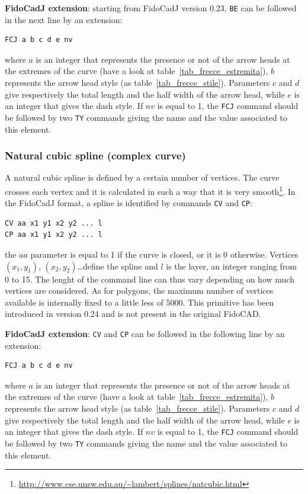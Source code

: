\documentclass[10pt,a4paper,twoside]{scrreprt}
\begin{document}
\textbf{FidoCadJ extension}: starting from FidoCadJ version 0.23, \lstinline!BE! can be followed in the next line by an extension:
\begin{lstlisting}
FCJ a b c d e nv
\end{lstlisting}
where $a$ is an integer that represents the presence or not of the arrow heads at the extremes of the curve (have a look at table~\ref{tab_frecce_estremita}), $b$ represents the arrow head style (as table~\ref{tab_frecce_stile}). Parameters $c$ and $d$ give respectively the total length and the half width of the arrow head, while $e$ is an integer that gives the dash style. If $nv$ is equal to 1, the \lstinline!FCJ! command should be followed by two \lstinline!TY! commands giving the name and the value associated to this element.

\subsubsection{Natural cubic spline (complex curve)}
A natural cubic spline is defined by a certain number of vertices. The curve crosses each vertex and it is calculated in such a way that it is very smooth\footnote{ \href{http://www.cse.unsw.edu.au/~lambert/splines/natcubic.html}{http://www.cse.unsw.edu.au/\textasciitilde lambert/splines/natcubic.html}}. In the FidoCadJ format, a spline is identified by commands \lstinline!CV! and \lstinline!CP!:
\begin{lstlisting}
CV aa x1 y1 x2 y2 ... l
CP aa x1 y1 x2 y2 ... l
\end{lstlisting}
the $aa$ parameter is equal to 1 if the curve is closed, or it is 0 otherwise. Vertices $(x_1, y_1)$, $(x_2, y_2)$\dots define the spline and $l$ is the layer, an integer ranging from 0 to 15.
The lenght of the command line can thus vary depending on how much vertices are considered.
As for polygons, the maximum number of vertices available is internally fixed to a little less of 5000. This primitive has been introduced in version 0.24 and is not present in the original FidoCAD.

\textbf{FidoCadJ extension}: \lstinline!CV! and \lstinline!CP! can be followed in the following line by an extension:
\begin{lstlisting}
FCJ a b c d e nv
\end{lstlisting}
where $a$ is an integer that represents the presence or not of the arrow heads at the extremes of the curve (have a look at table~\ref{tab_frecce_estremita}), $b$ represents the arrow head style (as table~\ref{tab_frecce_stile}). Parameters $c$ and $d$ give respectively the total length and the half width of the arrow head, while $e$ is an integer that gives the dash style. If $nv$ is equal to 1, the \lstinline!FCJ! command should be followed by two \lstinline!TY! commands giving the name and the value associated to this element.
\end{document}

